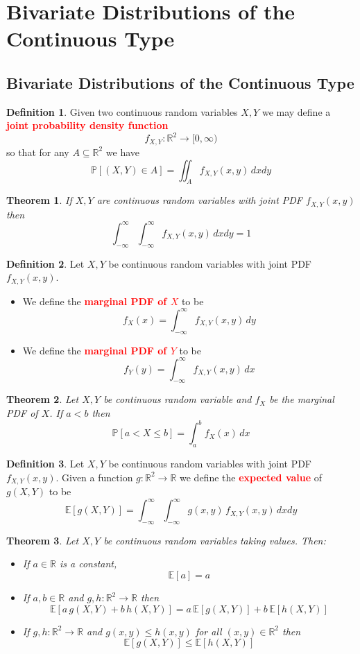 \documentclass{article}
\newcommand{\PP}{\mathbb{P}}
\newcommand{\R}{\mathbb{R}}
\newcommand{\E}{\mathbb{E}}
\newcommand{\bfred}[1]{\textcolor{red}{\textbf{#1}}}
\theoremstyle{plain}
\newtheorem{thm}{Theorem}[section]
\theoremstyle{definition}
\newtheorem{defn}{Definition}[section]
\theoremstyle{remark}
\begin{document}
\section{Bivariate Distributions of the Continuous Type}

\subsection{Bivariate Distributions of the Continuous Type}

\begin{defn}
    Given two continuous random variables $X,Y$ we may define a \bfred{joint probability density function} \[f_{X,Y}:\R^2\rightarrow[0,\infty)\] so that for any $A\subseteq\R^2$ we have \[\PP[(X,Y)\in A] = \iint_Af_{X,Y}(x,y)\,dxdy\]
\end{defn}

\begin{thm}
    If $X,Y$ are continuous random variables with joint PDF $f_{X,Y}(x,y)$ then \[\int_{-\infty}^{\infty}\int_{-\infty}^{\infty}f_{X,Y}(x,y)\,dxdy=1\]
\end{thm}

\begin{defn}
    Let $X,Y$ be continuous random variables with joint PDF $f_{X,Y}(x,y)$.
    \begin{itemize}
        \item We define the \bfred{marginal PDF of $X$} to be \[f_X(x)=\int_{-\infty}^\infty f_{X,Y}(x,y)\,dy\]
        \item We define the \bfred{marginal PDF of $Y$} to be \[f_Y(y)=\int_{-\infty}^\infty f_{X,Y}(x,y)\,dx\]
    \end{itemize}
\end{defn}

\begin{thm}
    Let $X,Y$ be continuous random variable and $f_X$ be the marginal PDF of $X$. If $a<b$ then \[\PP[a<X\leq b]=\int_a^b f_X(x)\,dx\]
\end{thm}

\begin{defn}
    Let $X,Y$ be continuous random variables with joint PDF $f_{X,Y}(x,y)$. Given a function $g:\R^2\rightarrow\R$ we define the \bfred{expected value} of $g(X,Y)$ to be \[\E[g(X,Y)]=\int_{-\infty}^\infty \int_{-\infty}^\infty g(x,y)\,f_{X,Y}(x,y)\,dxdy\]
\end{defn}

\begin{thm}
    Let $X,Y$ be continuous random variables taking values. Then:
    \begin{itemize}
        \item If $a\in\R$ is a constant, \[\E[a]=a\]
        \item If $a,b\in\R$ and $g,h:\R^2\rightarrow\R$ then \[\E[a\,g(X,Y)+b\,h(X,Y)]=a\,\E[g(X,Y)]+b\,\E[h(X,Y)]\]
        \item If $g,h:\R^2\rightarrow\R$ and $g(x,y)\leq h(x,y)$ for all $(x,y)\in \R^2$ then \[\E[g(X,Y)]\leq\E[h(X,Y)]\]
    \end{itemize}
\end{thm}
\end{document}
